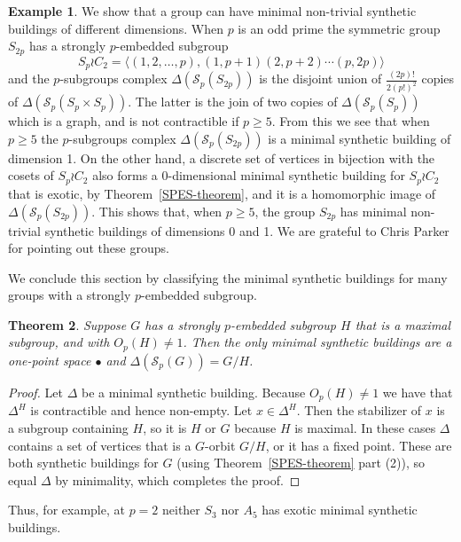\documentclass[12pt]{amsart}
\theoremstyle{plain}
\newtheorem{theorem}{Theorem}[section]
\theoremstyle{definition}
\newtheorem{example}[theorem]{Example}
\theoremstyle{remark}
\numberwithin{equation}{section}
\def\calS{{\mathcal S}}
\newcommand{\SpCpx}[2]{\Delta(\mathcal{S}_{#2}(#1))}
\begin{document}
\begin{example}
\label{two-dimensions-example}
We show that a group can have minimal non-trivial synthetic buildings of different dimensions.
    When $p$ is an odd prime the symmetric group $S_{2p}$ has a strongly $p$-embedded subgroup
    $$S_p\wr C_2=\langle (1,2,\ldots,p), (1,p+1)(2,p+2)\cdots(p,2p)\rangle$$ and the $p$-subgroups complex $\SpCpx{S_{2p}}{p}$ is the disjoint union of $\frac{(2p)!}{2(p!)^2}$ copies of $\SpCpx{S_p\times S_p}{p}$. The latter is the join of two copies of $\SpCpx{S_p}{p}$ which is a graph, and is not contractible if $p\ge 5$. From this we see that when $p\ge 5$ the $p$-subgroups complex $\SpCpx{S_{2p}}{p}$ is a minimal synthetic building of dimension 1. On the other hand, a discrete set of vertices in bijection with the cosets of $S_p\wr C_2$ also forms a 0-dimensional minimal synthetic building for $S_p\wr C_2$ that is exotic, by Theorem~\ref{SPES-theorem}, and it is a homomorphic image of $\SpCpx{S_{2p}}{p}$. This shows that, when $p\ge 5$, the group $S_{2p}$ has minimal non-trivial synthetic buildings of dimensions 0 and 1. We are grateful to Chris Parker for pointing out these groups.
\end{example}

We conclude this section by classifying the minimal synthetic buildings for many groups with a strongly $p$-embedded subgroup.

\begin{theorem}
\label{SPES-uniqueness-theorem}
    Suppose $G$ has a strongly $p$-embedded subgroup $H$ that is a maximal subgroup, and with $O_p(H)\ne 1$. Then the only minimal synthetic buildings are a one-point space $\bullet$ and $\Delta(\calS_p(G)) = G/H$.
\end{theorem}

\begin{proof}
Let $\Delta$ be a minimal synthetic building. Because $O_p(H)\ne 1$ we have that $\Delta^H$ is contractible and hence non-empty. Let $x\in\Delta^H$. Then the stabilizer of $x$ is a subgroup containing $H$, so it is $H$ or $G$ because $H$ is maximal. In these cases $\Delta$ contains a set of vertices that is a $G$-orbit $G/H$, or it has a fixed point. These are both synthetic buildings for $G$ (using Theorem~\ref{SPES-theorem} part (2)), so equal $\Delta$ by minimality, which completes the proof.
\end{proof}

Thus, for example, at $p=2$ neither $S_3$ nor $A_5$ has exotic minimal synthetic buildings.
\end{document}
